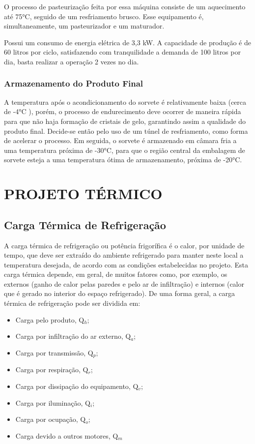 \documentclass[10pt,a4paper]{article}
\begin{document}
O processo de pasteurização feita por essa máquina consiste de um aquecimento até 75°C, seguido de um resfriamento brusco. Esse equipamento é, simultaneamente, um pasteurizador e um maturador.

Possui um consumo de energia elétrica de 3,3 kW. A capacidade de produção é de 60 litros por ciclo, satisfazendo com tranquilidade a demanda de 100 litros por dia, basta realizar a operação 2 vezes no dia.

\subsubsection{{Armazenamento do Produto Final}} 
A temperatura após o acondicionamento do sorvete é relativamente baixa (cerca de -4°C ), porém, o processo de endurecimento deve ocorrer de maneira rápida para que não haja formação de cristais de gelo, garantindo assim a qualidade do produto final. Decide-se então pelo uso de um túnel de resfriamento, como forma de acelerar o processo. Em seguida, o sorvete é armazenado em câmara fria a uma temperatura próxima de -30°C, para que o região central da embalagem de sorvete esteja a uma temperatura ótima de armazenamento, próxima de -20°C.

\newpage

\section{{ PROJETO TÉRMICO}}

\subsection{{ Carga Térmica de Refrigeração}}
\label{sec3.1}
A carga térmica de refrigeração ou potência frigorífica é o calor, por unidade de tempo, que deve ser extraído do ambiente refrigerado para manter neste local a temperatura desejada, de acordo com as condições estabelecidas no projeto. Esta carga térmica depende, em geral, de muitos fatores como, por exemplo, os externos (ganho de calor pelas paredes e pelo ar de infiltração) e internos (calor que é gerado no interior do espaço refrigerado). De uma forma geral, a carga térmica de refrigeração pode ser dividida em:

\begin{itemize}
    \item Carga pelo produto, Q$_h$;
    \item Carga por infiltração do ar externo, Q$_a$;
    \item Carga por transmissão, Q$_p$;
    \item Carga por respiração, Q$_r$;
    \item Carga por dissipação do equipamento, Q$_v$;
    \item Carga por iluminação, Q$_i$;
    \item Carga por ocupação, Q$_o$;
    \item Carga devido a outros motores, Q$_m$
\end{itemize}
\end{document}
